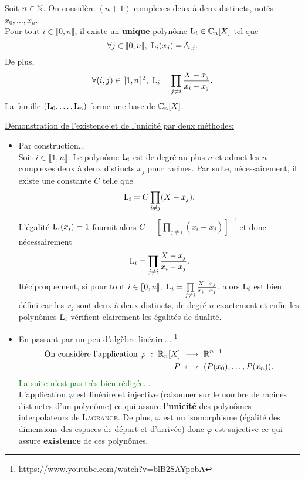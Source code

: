 \begin{tcolorbox}
    Soit $n \in \mathbb{N}$. On considère $(n + 1)$ complexes deux à deux distincts, notés $x_0, \dots, x_n$. \\
    Pour tout $i \in \llbracket 0, n \rrbracket$, il existe un \textbf{unique} polynôme $\mathrm{L}_i \in \mathbb{C}_n[X]$ tel que 
    $$\forall j \in \llbracket 0, n \rrbracket,\ \Lag_i(x_j) = \delta_{i,j}.$$
    De plus,
        $$\forall (i, j) \in \llbracket 1, n \rrbracket^2,\ \Lag_i = \prod_{j \neq i} \frac{X-x_j}{x_i - x_j}.$$
    La famille $(\mathrm{L}_0, \dots, \mathrm{L}_n)$ forme une base de $\mathbb{C}_n[X]$.
\end{tcolorbox}

\underline{Démonstration de l'existence et de l'unicité par deux méthodes:} 
\begin{itemize}
    \item Par construction...\cite{maths-france} \\
    Soit $i \in \llbracket 1, n \rrbracket$. Le polynôme $\mathrm{L}_i$ est de degré au plus $n$ et admet les $n$ complexes deux à deux distincts $x_j$ pour racines. Par suite, nécessairement, il existe une constante $C$ telle que 
    $$\mathrm{L}_i = C \prod_{i \not= j} (X-x_j).$$
    L'égalité $\mathrm{L}_i(x_i) = 1$ fournit alors $C = \left[ \prod\limits_{j \not=i}(x_i - x_j) \right]^{-1}$ et donc nécessairement
    $$\mathrm{L}_i = \prod_{j \neq i} \frac{X-x_j}{x_i - x_j}.$$
    Réciproquement, si pour tout $i \in \llbracket 0, n\rrbracket,\ \mathrm{L}_i = \prod\limits_{j \neq i} \frac{X-x_j}{x_i - x_j}$, alors $\mathrm{L}_i$ est bien défini car les $x_j$ sont deux à deux distincts, de degré $n$ exactement et enfin les polynômes $\mathrm{L}_i$ vérifient clairement les égalités de dualité.
    \item En passant par un peu d'algèbre linéaire... \footnote{\url{https://www.youtube.com/watch?v=blB2SAYpobA}}
    \begin{alignat*}{2}
        \text{On considère l'application } \varphi\ :\ \R_n[X]\ &\longrightarrow\ \R^{n+1}\\
        P\ &\longmapsto\ (P(x_0), \dots, P(x_n)).
    \end{alignat*}
    \textcolor{green}{La suite n'est pas très bien rédigée...} \\
    L'application $\varphi$ est linéaire et injective (raisonner sur le nombre de racines distinctes d'un polynôme) ce qui assure \textbf{l'unicité} des polynômes interpolateurs de \textsc{Lagrange}. De plus, $\varphi$ est un isomorphisme (égalité des dimensions des espaces de départ et d'arrivée) donc $\varphi$ est sujective ce qui assure \textbf{existence} de ces polynômes. 
\end{itemize}